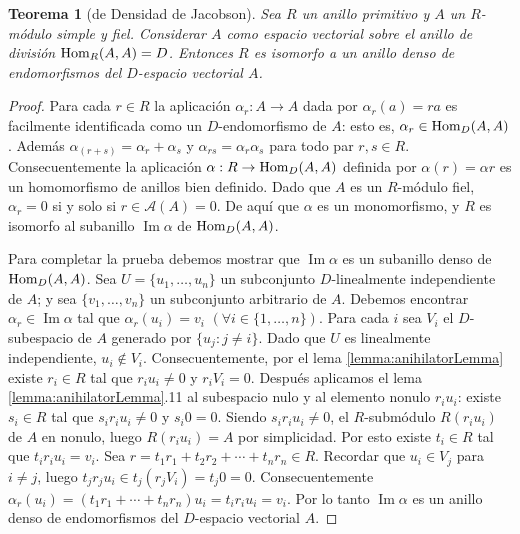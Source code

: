 \documentclass{report}
\newcommand{\Hom}{\textnormal{Hom}}
\DeclareMathOperator{\image}{\text{Im}}
\newtheorem{theorem}{Teorema}
\begin{document}
  \begin{theorem}[de Densidad de Jacobson]
    \label{theorem:jacobsonDensityTheorem}
    Sea \(R\) un anillo primitivo y \(A\) un \(R\)-módulo simple y fiel.
    Considerar \(A\) como espacio vectorial sobre el anillo de división \(\Hom_R(A, A) = D\).
    Entonces \(R\) es isomorfo a un anillo denso de endomorfismos del \(D\)-espacio vectorial \(A\).
  \end{theorem}
  \begin{proof}
    Para cada \(r \in R\) la aplicación \(\alpha_r : A \rightarrow A\) dada por \(\alpha_r(a) = r a\) es facilmente identificada como un \(D\)-endomorfismo de \(A\): esto es, \(\alpha_r \in \Hom_D(A, A)\).
    Además \(\alpha_{(r + s)} = \alpha_r + \alpha_s\) y \(\alpha_{r s} = \alpha_r \alpha_s\) para todo par \(r, s \in R\).
    Consecuentemente la aplicación \(\alpha : R \rightarrow \Hom_D(A, A)\) definida por \(\alpha(r) = \alpha r\) es un homomorfismo de anillos bien definido.
    Dado que \(A\) es un \(R\)-módulo fiel, \(\alpha_r = 0\) si y solo si \(r \in \mathcal{A}(A) = 0\).
    De aquí que \(\alpha\) es un monomorfismo, y \(R\) es isomorfo al subanillo \(\image \alpha\) de \(\Hom_D(A, A)\).

    Para completar la prueba debemos mostrar que \(\image \alpha\) es un subanillo denso de \(\Hom_D(A, A)\).
    Sea \(U = \{u_1, \dots, u_n\}\) un subconjunto \(D\)-linealmente independiente de \(A\); y sea \(\{v_1, \dots, v_n\}\) un subconjunto arbitrario de \(A\).
    Debemos encontrar \(\alpha_r \in \image \alpha\) tal que \(\alpha_r(u_i) = v_i\) \((\forall i \in \{1, \dots, n\})\).
    Para cada \(i\) sea \(V_i\) el \(D\)-subespacio de \(A\) generado por \(\{u_j : j \neq i\}\).
    Dado que \(U\) es linealmente independiente, \(u_i \notin V_i\).
    Consecuentemente, por el lema \ref{lemma:anihilatorLemma} existe \(r_i \in R\) tal que \(r_i u_i \neq 0\) y \(r_i V_i = 0\).
    Después aplicamos el lema \ref{lemma:anihilatorLemma}.11 al subespacio nulo y al elemento nonulo \(r_i u_i\):
    existe \(s_i \in R\) tal que \(s_i r_i u_i \neq 0\) y \(s_i 0 = 0\).
    Siendo \(s_i r_i u_i \neq 0\), el \(R\)-submódulo \(R (r_i u_i)\) de \(A\) en nonulo, luego \(R (r_i u_i) = A\) por simplicidad.
    Por esto existe \(t_i \in R\) tal que \(t_i r_i u_i = v_i\).
    Sea \(r = t_1 r_1 + t_2 r_2 + \cdots + t_n r_n \in R\).
    Recordar que \(u_i \in V_j\) para \(i \neq j\), luego \(t_j r_j u_i \in t_j (r_j V_i) = t_j 0 = 0\).
    Consecuentemente \(\alpha_r(u_i) = (t_1 r_1 + \cdots + t_n r_n) u_i = t_i r_i u_i = v_i\).
    Por lo tanto \(\image \alpha\) es un anillo denso de endomorfismos del \(D\)-espacio vectorial \(A\).
  \end{proof}
\end{document}
